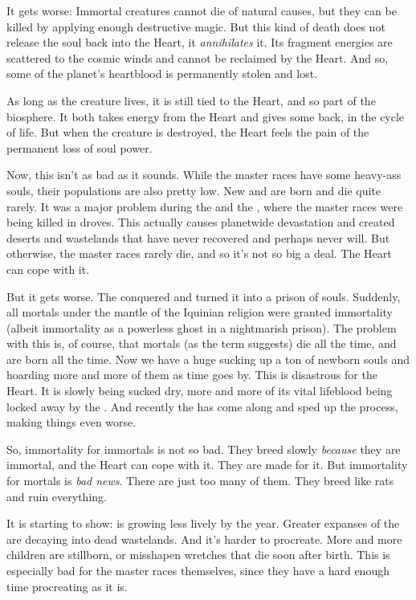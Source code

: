 It gets worse: 
Immortal creatures cannot die of natural causes, but they can be killed by applying enough destructive magic. 
But this kind of death does not release the soul back into the Heart, it \emph{annihilates} it. 
Its fragment energies are scattered to the cosmic winds and cannot be reclaimed by the Heart. 
And so, some of the planet's heartblood is permanently stolen and lost. 

As long as the creature lives, it is still tied to the Heart, and so part of the biosphere. 
It both takes energy from the Heart and gives some back, in the cycle of life. 
But when the creature is destroyed, the Heart feels the pain of the permanent loss of soul power. 

Now, this isn't as bad as it sounds. 
While the master races have some heavy-ass souls, their populations are also pretty low. 
New \dragons{} and \resphain{} are born and die quite rarely. 
It was a major problem during the \secondbanewar{} and the \resphanwars, where the master races were being killed in droves. 
This actually causes planetwide devastation and created deserts and wastelands that have never recovered and perhaps never will. 
But otherwise, the master races rarely die, and so it's not so big a deal. 
The Heart can cope with it. 

But it gets worse. 
The \banelords{} conquered \iquin{} and turned it into a prison of souls. 
Suddenly, all mortals under the mantle of the Iquinian religion were granted immortality (albeit immortality as a powerless ghost in a nightmarish prison). 
The problem with this is, of course, that mortals (as the term suggests) die all the time, and are born all the time. 
Now we have a huge  sucking up a ton of newborn souls and hoarding more and more of them as time goes by. 
This is disastrous for the Heart. 
It is slowly being sucked dry, more and more of its vital lifeblood being locked away by the \sephiroth. 
And recently the  has come along and sped up the process, making things even worse. 

So, immortality for immortals is not so bad. 
They breed slowly \emph{because} they are immortal, and the Heart can cope with it. 
They are made for it. 
But immortality for mortals is \emph{bad news}. 
There are just too many of them.
They breed like rats and ruin everything. 

It is starting to show: 
\Miith{} is growing less lively by the year. 
Greater expanses of the \Wylde{} are decaying into dead wastelands. 
And it's harder to procreate. 
More and more children are stillborn, or misshapen wretches that die soon after birth. 
This is especially bad for the master races themselves, since they have a hard enough time procreating as it is. 

